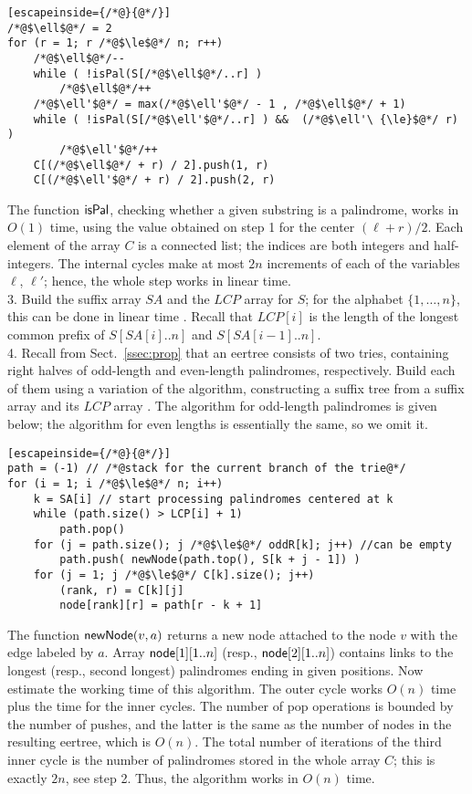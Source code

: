 \documentclass{llncs}
\def\newv{{\sf newNode}}
\def\nod{{\sf node}}
\begin{document}
\begin{lstlisting}[escapeinside={/*@}{@*/}]
/*@$\ell$@*/ = 2
for (r = 1; r /*@$\le$@*/ n; r++)
	/*@$\ell$@*/--
	while ( !isPal(S[/*@$\ell$@*/..r] )
		/*@$\ell$@*/++
	/*@$\ell'$@*/ = max(/*@$\ell'$@*/ - 1 , /*@$\ell$@*/ + 1)
	while ( !isPal(S[/*@$\ell'$@*/..r] ) &&  (/*@$\ell'\ {\le}$@*/ r) )
		/*@$\ell'$@*/++
	C[(/*@$\ell$@*/ + r) / 2].push(1, r)
	C[(/*@$\ell'$@*/ + r) / 2].push(2, r)
\end{lstlisting}

The function $\sf isPal$, checking whether a given substring is a palindrome, works in $O(1)$ time, using the value obtained on step 1 for the center $(\ell{+}r)/2$. Each element of the array $C$ is a connected list; the indices are both integers and half-integers. The internal cycles make at most $2n$ increments of each of the variables $\ell$, $\ell'$; hence, the whole step works in linear time.\\[2pt]
3. Build the suffix array $SA$ and the $LCP$ array for $S$; for the alphabet $\{1,\ldots,n\}$, this can be done in linear time \cite{PST07}. Recall that $LCP[i]$ is the length of the longest common prefix of $S[SA[i]..n]$ and $S[SA[i{-}1]..n]$.\\[2pt] 
4. Recall from Sect.~\ref{ssec:prop} that an eertree consists of two tries, containing right halves of odd-length and even-length palindromes, respectively. Build each of them using a variation of the algorithm, constructing a suffix tree from a suffix array and its $LCP$ array \cite{KLAAP01}. The algorithm for odd-length palindromes is given below; the algorithm for even lengths is essentially the same, so we omit it.

\begin{lstlisting}[escapeinside={/*@}{@*/}]
path = (-1) // /*@stack for the current branch of the trie@*/
for (i = 1; i /*@$\le$@*/ n; i++)
	k = SA[i] // start processing palindromes centered at k
	while (path.size() > LCP[i] + 1)
		path.pop()
	for (j = path.size(); j /*@$\le$@*/ oddR[k]; j++) //can be empty
		path.push( newNode(path.top(), S[k + j - 1]) )
	for (j = 1; j /*@$\le$@*/ C[k].size(); j++)
		(rank, r) = C[k][j]
		node[rank][r] = path[r - k + 1]
\end{lstlisting}

The function $\newv(v,a)$ returns a new node attached to the node $v$ with the edge labeled by $a$. Array $\nod[1][1..n]$ (resp., $\nod[2][1..n]$) contains links to the longest (resp., second longest) palindromes ending in given positions. Now estimate the working time of this algorithm. The outer cycle works $O(n)$ time plus the time for the inner cycles. The number of pop operations is bounded by  the number of pushes, and the latter is the same as the number of nodes in the resulting eertree, which is $O(n)$. The total number of iterations of the third inner cycle is the number of palindromes stored in the whole array $C$; this is exactly $2n$, see step 2. Thus, the algorithm works in $O(n)$ time. 
\end{document}
